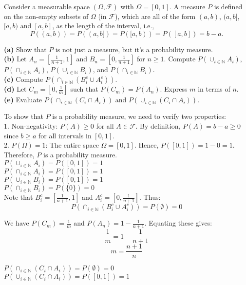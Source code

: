 \begin{exercise}
    Consider a measurable space $(\Omega, \mathcal{F})$ with $\Omega = [0, 1]$. A measure $P$ is defined on the non-empty subsets of $\Omega$ (in $\mathcal{F}$), which are all of the form $(a, b)$, $(a, b]$, $[a, b)$ and $[a, b]$, as the length of the interval, i.e.,
\[
P((a, b)) = P((a, b]) = P([a, b)) = P([a, b]) = b - a.
\]

\textbf{(a)} Show that $P$ is not just a measure, but it's a probability measure.\\
\textbf{(b)} Let $A_n = \left[ \frac{1}{n+1}, 1 \right]$ and $B_n = \left[ 0, \frac{1}{n+1} \right]$ for $n \geq 1$. Compute $P\left(\cup_{i \in \mathbb{N}} A_i\right)$, $P\left(\cap_{i \in \mathbb{N}} A_i\right)$, $P\left(\cup_{i \in \mathbb{N}} B_i\right)$, and $P\left(\cap_{i \in \mathbb{N}} B_i\right)$.\\
\textbf{(c)} Compute $P\left(\cap_{i \in \mathbb{N}} (B_i^c \cup A_i^c)\right)$.\\
\textbf{(d)} Let $C_m = \left[0, \frac{1}{m}\right]$ such that $P(C_m) = P(A_n)$. Express $m$ in terms of $n$.\\
\textbf{(e)} Evaluate $P\left(\cap_{i \in \mathbb{N}} (C_i \cap A_i)\right)$ and $P\left(\cup_{i \in \mathbb{N}} (C_i \cap A_i)\right)$.
\end{exercise}

\begin{solution}
    To show that $P$ is a probability measure, we need to verify two properties:\\

    1. Non-negativity: $P(A) \geq 0$ for all $A \in \mathcal{F}$. By definition, $P(A) = b - a \geq 0$ since $b \geq a$ for all intervals in $[0, 1]$.\\
    
    2. $P(\Omega) = 1$: The entire space $\Omega = [0, 1]$. Hence, $P([0, 1]) = 1 - 0 = 1$.\\
    
    Therefore, $P$ is a probability measure.\\
    
    $P\left(\cup_{i \in \mathbb{N}} A_i\right) = P([0, 1]) = 1$\\
    $P\left(\cap_{i \in \mathbb{N}} A_i\right) = P\left([0, 1]\right) = 1$\\
    $P\left(\cup_{i \in \mathbb{N}} B_i\right) = P([0, 1]) = 1$\\
    $P\left(\cap_{i \in \mathbb{N}} B_i\right) = P(\{0\}) = 0$\\
    
    Note that $B_i^c = [\frac{1}{n+1}, 1]$ and $A_i^c = [0, \frac{1}{n+1}]$. Thus:
    \[
    P\left(\cap_{i \in \mathbb{N}} (B_i^c \cup A_i^c)\right) = P(\emptyset) = 0
    \]
    
    We have $P(C_m) = \frac{1}{m}$ and $P(A_n) = 1 - \frac{1}{n+1}$. Equating these gives:
    \[
    \frac{1}{m} = 1 - \frac{1}{n+1}
    \]
    \[
    m = \frac{n+1}{n}
    \]
    
    
    $P\left(\cap_{i \in \mathbb{N}} (C_i \cap A_i)\right) = P(\emptyset) = 0$\\
    $P\left(\cup_{i \in \mathbb{N}} (C_i \cap A_i)\right) = P([0, 1]) = 1$\\
\end{solution}